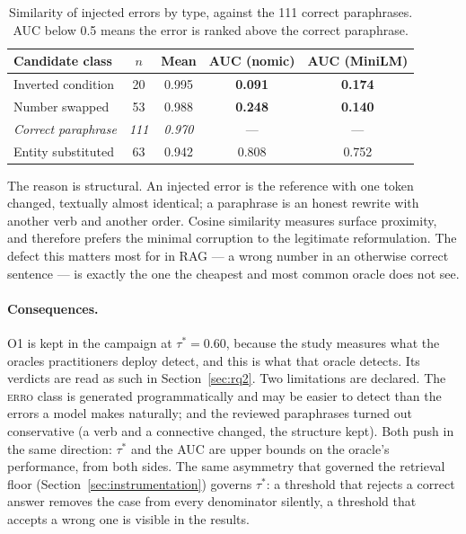 \documentclass[a4paper,fleqn]{cas-dc}
\begin{document}
\begin{table}[width=\linewidth,cols=5,pos=h]
\caption{Similarity of injected errors by type, against the 111 correct
paraphrases. AUC below 0.5 means the error is ranked above the correct
paraphrase.}
\label{tab:auc}
\begin{tabular*}{\tblwidth}{@{} LCCCC @{}}
\toprule
Candidate class & $n$ & Mean & AUC (nomic) & AUC (MiniLM) \\
\midrule
Inverted condition   & 20  & 0.995 & \textbf{0.091} & \textbf{0.174} \\
Number swapped       & 53  & 0.988 & \textbf{0.248} & \textbf{0.140} \\
\emph{Correct paraphrase} & \emph{111} & \emph{0.970} & --- & --- \\
Entity substituted   & 63  & 0.942 & 0.808 & 0.752 \\
\bottomrule
\end{tabular*}
\end{table}

The reason is structural. An injected error is the reference with one token
changed, textually almost identical; a paraphrase is an honest rewrite with
another verb and another order. Cosine similarity measures surface proximity,
and therefore prefers the minimal corruption to the legitimate reformulation.
The defect this matters most for in RAG --- a wrong number in an otherwise
correct sentence --- is exactly the one the cheapest and most common oracle
does not see.

\paragraph{Consequences.} O1 is kept in the campaign at $\tau^\ast = 0.60$,
because the study measures what the oracles practitioners deploy detect, and
this is what that oracle detects. Its verdicts are read as such in
Section~\ref{sec:rq2}. Two limitations are declared. The \textsc{erro} class is
generated programmatically and may be easier to detect than the errors a model
makes naturally; and the reviewed paraphrases turned out conservative (a verb
and a connective changed, the structure kept). Both push in the same
direction: $\tau^\ast$ and the AUC are upper bounds on the oracle's
performance, from both sides. The same asymmetry that governed the retrieval
floor (Section~\ref{sec:instrumentation}) governs $\tau^\ast$: a threshold
that rejects a correct answer removes the case from every denominator
silently, a threshold that accepts a wrong one is visible in the results.
\end{document}
